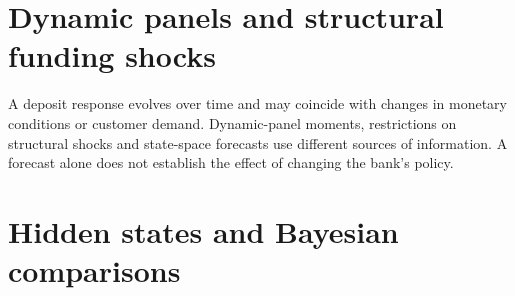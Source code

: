 \documentclass[11pt,a4paper,openany]{book}
\begin{document}











\chapter{Dynamic panels and structural funding shocks}
A deposit response evolves over time and may coincide with changes in
monetary conditions or customer demand. Dynamic-panel moments, restrictions
on structural shocks and state-space forecasts use different sources of
information. A forecast alone does not establish the effect of changing the
bank's policy.















\chapter{Hidden states and Bayesian comparisons}
\end{document}
